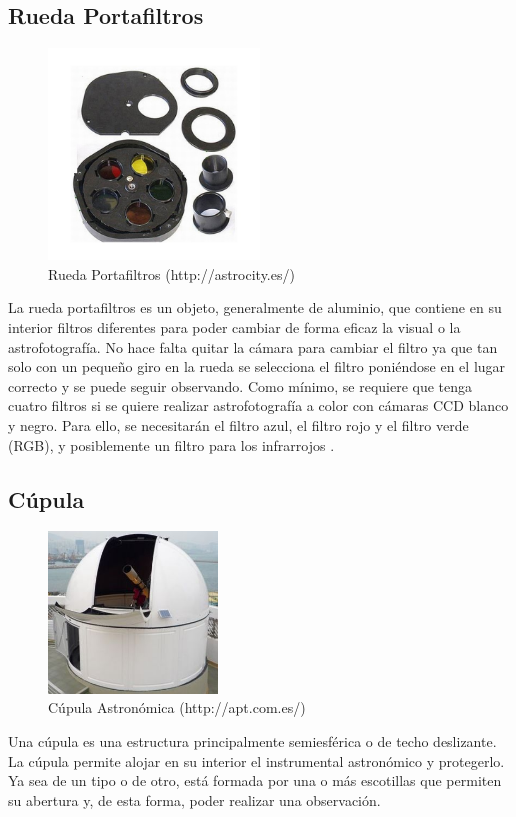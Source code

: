 \subsection{Rueda Portafiltros}
\begin{figure}[htb]
\centering
\includegraphics[width=0.5\textwidth]{./imagenes/ruedaPortafiltros}
\caption{Rueda Portafiltros (http://astrocity.es/)} \label{fig:ruedaPortafiltros}
\end{figure}
La rueda portafiltros es un objeto, generalmente de aluminio, que contiene en su interior filtros diferentes para poder cambiar de forma eficaz la visual o la astrofotografía. No hace falta quitar la cámara para cambiar el filtro ya que tan solo con un pequeño giro en la rueda se selecciona el filtro poniéndose en el lugar correcto y se puede seguir observando.
Como mínimo, se requiere que tenga cuatro filtros si se quiere realizar astrofotografía a color con cámaras CCD blanco y negro. Para ello, se necesitarán el filtro azul, el filtro rojo y el filtro verde (RGB), y posiblemente un filtro para los infrarrojos \cite{RuedaPortafiltros}.


\subsection{Cúpula}
\begin{figure}[htb]
\centering
\includegraphics[width=0.4\textwidth]{./imagenes/cupula}
\caption{Cúpula Astronómica (http://apt.com.es/)} \label{fig:cupula}
\end{figure}
Una cúpula es una estructura principalmente semiesférica o de techo deslizante. La cúpula permite alojar en su interior el instrumental astronómico y protegerlo. Ya sea de un tipo o de otro, está formada por una o más escotillas que permiten su abertura y, de esta forma, poder realizar una observación.


